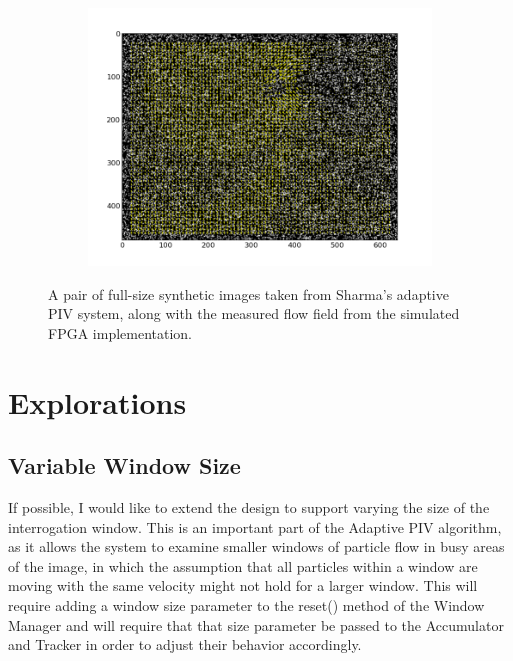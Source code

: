 \documentclass{article}
\begin{document}
\begin{figure}
	\begin{subfigure}[htb]{\textwidth}
		\centerline{\includegraphics[trim = .4in .4in .4in .4in, clip, width=1.5\textwidth]{../../data/vort_sim/PIV.png}}
	\end{subfigure}
	\caption{A pair of full-size synthetic images taken from Sharma's adaptive PIV system, along with the measured flow field from the simulated FPGA implementation.}
	\label{fig:full_test}
\end{figure}

\section{Explorations}
\subsection{Variable Window Size}
If possible, I would like to extend the design to support varying the size of the interrogation window. This is an important part of the Adaptive PIV algorithm, as it allows the system to examine smaller windows of particle flow in busy areas of the image, in which the assumption that all particles within a window are moving with the same velocity might not hold for a larger window. This will require adding a window size parameter to the reset() method of the Window Manager and will require that that size parameter be passed to the Accumulator and Tracker in order to adjust their behavior accordingly. 
\end{document}
